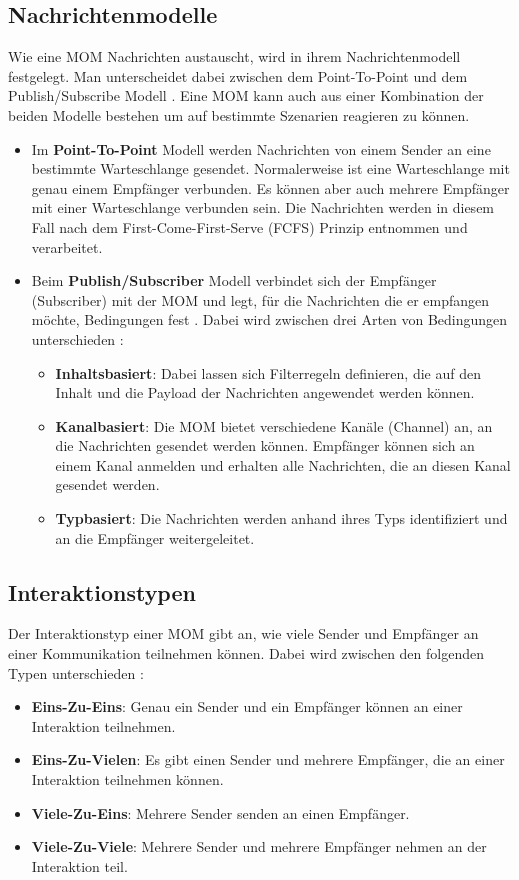 \subsection{Nachrichtenmodelle}
\label{sec:nachrichtenmodelle}
Wie eine MOM Nachrichten austauscht, wird in ihrem Nachrichtenmodell festgelegt. Man unterscheidet dabei zwischen dem Point-To-Point und dem Publish/Subscribe Modell \cite{Curry05}. Eine MOM kann auch aus einer Kombination der beiden Modelle bestehen um auf bestimmte Szenarien reagieren zu können.
\begin{itemize}
\item Im \textbf{Point-To-Point} Modell werden Nachrichten von einem Sender an eine bestimmte  Warteschlange gesendet. Normalerweise ist eine Warteschlange mit genau einem Empfänger verbunden. Es können aber auch mehrere Empfänger mit einer Warteschlange verbunden sein. Die Nachrichten werden in diesem Fall nach dem First-Come-First-Serve (FCFS) Prinzip entnommen und verarbeitet. 
\item Beim \textbf{Publish/Subscriber} Modell verbindet sich der Empfänger (Subscriber) mit der MOM und legt, für die Nachrichten die er empfangen möchte, Bedingungen fest \cite{Eugster03}. Dabei wird zwischen drei Arten von Bedingungen unterschieden \cite{Rathfelder2013}:
\begin{itemize}
    \item \textbf{Inhaltsbasiert}: Dabei lassen sich Filterregeln definieren, die auf den Inhalt und die Payload der Nachrichten angewendet werden können.
    \item \textbf{Kanalbasiert}: Die MOM bietet verschiedene Kanäle (Channel) an, an die Nachrichten gesendet werden können. Empfänger können sich an einem Kanal anmelden und erhalten alle Nachrichten, die an diesen Kanal gesendet werden.
    \item \textbf{Typbasiert}: Die Nachrichten werden anhand ihres Typs identifiziert und an die Empfänger weitergeleitet.
\end{itemize}
\end{itemize}

\subsection{Interaktionstypen}
Der Interaktionstyp einer MOM gibt an, wie viele Sender und Empfänger an einer Kommunikation teilnehmen können. Dabei wird zwischen den folgenden Typen unterschieden \cite{Rathfelder2013}:
\begin{itemize}
    \item \textbf{Eins-Zu-Eins}: Genau ein Sender und ein Empfänger können an einer Interaktion teilnehmen.
    \item \textbf{Eins-Zu-Vielen}: Es gibt einen Sender und mehrere Empfänger, die an einer Interaktion teilnehmen können. 
    \item \textbf{Viele-Zu-Eins}: Mehrere Sender senden an einen Empfänger.
    \item \textbf{Viele-Zu-Viele}: Mehrere Sender und mehrere Empfänger nehmen an der Interaktion teil.
\end{itemize}

